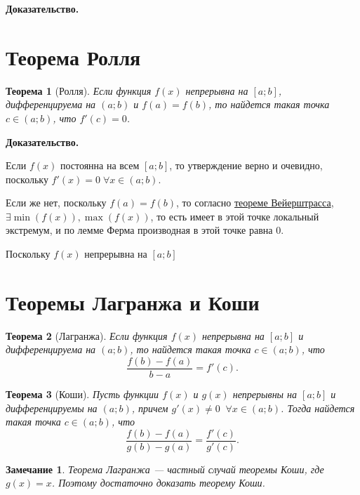 \documentclass[a4paper,12pt]{extbook}
\theoremstyle{named}
\newtheorem*{theorem}{Теорема}
\theoremstyle{named}
\newtheorem*{note}{Замечание}
\newcommand{\newpar}{$ $\par\nobreak\ignorespaces}
\renewenvironment{proof}[1][]{\noindent\textbf{Доказательство\if\relax\detokenize{#1}\relax\else\;#1\fi.} \newpar}{\bigskip}
\begin{document}
\begin{proof}
\end{proof}



\section{Теорема Ролля}%
\label{sec:Теорема Ролля}
\begin{theorem}[Ролля]
    Если функция \(f(x)\) непрерывна на \([a; b]\), дифференцируема на \((a; b)\) и \(f(a) = f(b)\), то найдется такая точка \(c \in (a; b)\), что \(f'(c) = 0\).
\end{theorem}

\begin{proof}
    Если \(f(x)\) постоянна на всем \([a; b]\), то утверждение верно и очевидно, поскольку \(f'(x) = 0 \; \forall x \in (a; b)\).

    Если же нет, поскольку \(f(a) = f(b)\), то согласно \hyperref[sec:Теорема Вейерштрасса]{теореме Вейерштрасса}, \(\exists \min{(f(x)), \max{(f(x))}}\), то есть имеет в этой точке локальный экстремум, и по лемме Ферма производная в этой точке равна 0.

    Поскольку \(f(x)\) непрерывна на \([a; b]\)
\end{proof}



\section{Теоремы Лагранжа и Коши}%
\label{sec:Теоремы Лагранжа и Коши}
\begin{theorem}[Лагранжа]
    Если функция \(f(x)\) непрерывна на \([a; b]\) и дифференцируема на \((a; b)\), то найдется такая точка \(c \in (a; b)\), что
    \[
        \frac{f(b) - f(a)}{b - a} = f'(c).
    \]
\end{theorem}

\begin{theorem}[Коши]
    Пусть функции \(f(x)\) и \(g(x)\) непрерывны на \([a; b]\) и дифференцируемы на \((a; b)\), причем \(g'(x) \neq 0 \;\; \forall x \in (a; b)\). Тогда найдется такая точка \(c \in (a; b)\), что
    \[
        \frac{f(b) - f(a)}{g(b) - g(a)} = \frac{f'(c)}{g'(c)}.
    \]
\end{theorem}

\begin{note}
    Теорема Лагранжа — частный случай теоремы Коши, где \(g(x) = x\). Поэтому достаточно доказать теорему Коши.
\end{note}
\end{document}
